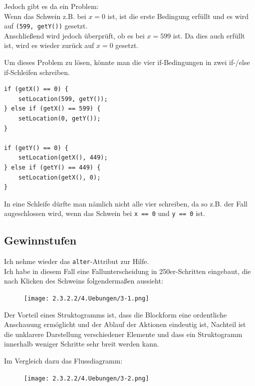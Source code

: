 \documentclass{scrartcl}   %
\begin{document}
Jedoch gibt es da ein Problem:\\
Wenn das Schwein z.B. bei $x=0$ ist, ist die erste Bedingung erfüllt und es wird auf \texttt{(599, getY())} gesetzt.\\
Anschließend wird jedoch überprüft, ob es bei $x=599$ ist. Da dies auch erfüllt ist, wird es wieder zurück auf $x=0$ gesetzt.

Um dieses Problem zu lösen, könnte man die vier if-Bedingungen in zwei if-/else if-Schleifen schreiben.

\begin{lstlisting}
if (getX() == 0) {
    setLocation(599, getY());
} else if (getX() == 599) {
    setLocation(0, getY());
}

if (getY() == 0) {
    setLocation(getX(), 449);
} else if (getY() == 449) {
    setLocation(getX(), 0);
}
\end{lstlisting}

In eine Schleife dürfte man nämlich nicht alle vier schreiben, da so z.B. der Fall augeschlossen wird, wenn das Schwein bei \texttt{x == 0} und \texttt{y == 0} ist.

\newpage

\subsection{Gewinnstufen}

Ich nehme wieder das \texttt{alter}-Attribut zur Hilfe.\\
Ich habe in diesem Fall eine Fallunterscheidung in 250er-Schritten eingebaut, die nach Klicken des Schweins folgendermaßen aussieht:\\

\begin{figure}[ht]
	\centering
	\texttt{[image: 2.3.2.2/4.Uebungen/3-1.png]}
\end{figure}

Der Vorteil eines Struktogramms ist, dass die Blockform eine ordentliche Anschauung ermöglicht und der Ablauf der Aktionen eindeutig ist, Nachteil ist die unklarere Darstellung verschiedener Elemente und dass ein Struktogramm innerhalb weniger Schritte sehr breit werden kann.\\

\newpage

Im Vergleich dazu das Flussdiagramm:

\begin{figure}[ht]
	\centering
	\texttt{[image: 2.3.2.2/4.Uebungen/3-2.png]}
\end{figure}
\end{document}
